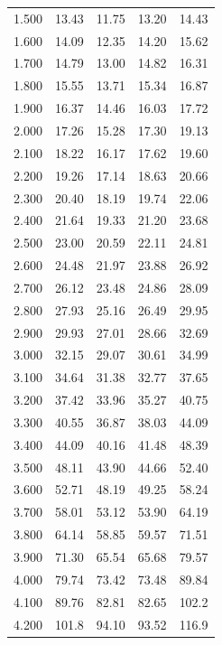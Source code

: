 \documentclass[a4paper]{IEEEtran}
\begin{document}
\begin{table}[]
\begin{tabular}{c|cccc}
            1.500 & 13.43 & 11.75 & 13.20 & 14.43 \\
            1.600 & 14.09 & 12.35 & 14.20 & 15.62 \\
            1.700 & 14.79 & 13.00 & 14.82 & 16.31 \\
            1.800 & 15.55 & 13.71 & 15.34 & 16.87 \\
            1.900 & 16.37 & 14.46 & 16.03 & 17.72 \\
            2.000 & 17.26 & 15.28 & 17.30 & 19.13 \\
            2.100 & 18.22 & 16.17 & 17.62 & 19.60 \\
            2.200 & 19.26 & 17.14 & 18.63 & 20.66 \\
            2.300 & 20.40 & 18.19 & 19.74 & 22.06 \\
            2.400 & 21.64 & 19.33 & 21.20 & 23.68 \\
            2.500 & 23.00 & 20.59 & 22.11 & 24.81 \\
            2.600 & 24.48 & 21.97 & 23.88 & 26.92 \\
            2.700 & 26.12 & 23.48 & 24.86 & 28.09 \\
            2.800 & 27.93 & 25.16 & 26.49 & 29.95 \\
            2.900 & 29.93 & 27.01 & 28.66 & 32.69 \\
            3.000 & 32.15 & 29.07 & 30.61 & 34.99 \\
            3.100 & 34.64 & 31.38 & 32.77 & 37.65 \\
            3.200 & 37.42 & 33.96 & 35.27 & 40.75 \\
            3.300 & 40.55 & 36.87 & 38.03 & 44.09 \\
            3.400 & 44.09 & 40.16 & 41.48 & 48.39 \\
            3.500 & 48.11 & 43.90 & 44.66 & 52.40 \\
            3.600 & 52.71 & 48.19 & 49.25 & 58.24 \\
            3.700 & 58.01 & 53.12 & 53.90 & 64.19 \\
            3.800 & 64.14 & 58.85 & 59.57 & 71.51 \\
            3.900 & 71.30 & 65.54 & 65.68 & 79.57 \\
            4.000 & 79.74 & 73.42 & 73.48 & 89.84 \\
            4.100 & 89.76 & 82.81 & 82.65 & 102.2 \\
            4.200 & 101.8 & 94.10 & 93.52 & 116.9 \\

\end{tabular}
\end{table}
\end{document}
